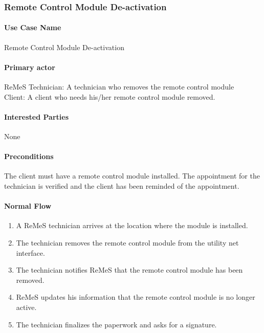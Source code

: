 \subsubsection{Remote Control Module De-activation}

\paragraph{Use Case Name}
Remote Control Module De-activation
\paragraph{Primary actor}
ReMeS Technician: A technician who removes the remote control module \\
Client: A client who needs his/her remote control module removed.
\paragraph{Interested Parties}
None
\paragraph{Preconditions}
The client must have a remote control module installed. The appointment for the technician is verified and 
the client has been reminded of the appointment.
\paragraph{Normal Flow}
\begin{enumerate}
	\item A ReMeS technician arrives at the location where the module is installed.
	\item The technician removes the remote control module from the utility net interface.
	\item The technician notifies ReMeS that the remote control module has been removed.
	\item ReMeS updates his information that the remote control module is no longer active.
	\item The technician finalizes the paperwork and asks for a signature.
\end{enumerate}

